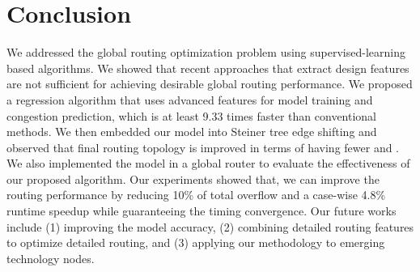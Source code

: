 \section{Conclusion}
\label{sec:conlu}

We addressed the global routing optimization problem using supervised-learning based algorithms.
We showed that recent approaches that extract design features are not sufficient for achieving desirable global routing performance.
We proposed a regression algorithm that uses advanced features for model training and congestion prediction, which is at least 9.33 times faster than conventional methods.
We then embedded our model into Steiner tree edge shifting and observed that final  routing topology is improved in terms of having fewer  and .
We also implemented the model in a global router to evaluate the effectiveness of our proposed algorithm.
Our experiments showed that, we can improve the routing performance by reducing 10\% of total overflow and a case-wise 4.8\% runtime speedup while guaranteeing the timing convergence.
Our future works include (1) improving the model accuracy, (2) combining  detailed routing features to optimize detailed routing, and (3) applying our methodology to emerging technology nodes.
